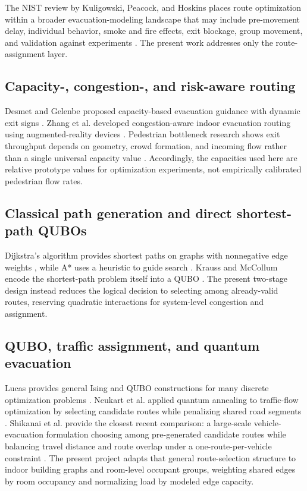 \documentclass[11pt]{article}
\begin{document}
The NIST review by Kuligowski, Peacock, and Hoskins places route optimization within a broader evacuation-modeling landscape that may include pre-movement delay, individual behavior, smoke and fire effects, exit blockage, group movement, and validation against experiments \cite{kuligowski}. The present work addresses only the route-assignment layer.

\subsection{Capacity-, congestion-, and risk-aware routing}
Desmet and Gelenbe proposed capacity-based evacuation guidance with dynamic exit signs \cite{desmet}. Zhang et al. developed congestion-aware indoor evacuation routing using augmented-reality devices \cite{zhang}. Pedestrian bottleneck research shows exit throughput depends on geometry, crowd formation, and incoming flow rather than a single universal capacity value \cite{ye}. Accordingly, the capacities used here are relative prototype values for optimization experiments, not empirically calibrated pedestrian flow rates.

\subsection{Classical path generation and direct shortest-path QUBOs}
Dijkstra's algorithm provides shortest paths on graphs with nonnegative edge weights \cite{dijkstra}, while A* uses a heuristic to guide search \cite{astar}. Krauss and McCollum encode the shortest-path problem itself into a QUBO \cite{krauss}. The present two-stage design instead reduces the logical decision to selecting among already-valid routes, reserving quadratic interactions for system-level congestion and assignment.

\subsection{QUBO, traffic assignment, and quantum evacuation}
Lucas provides general Ising and QUBO constructions for many discrete optimization problems \cite{lucas}. Neukart et al. applied quantum annealing to traffic-flow optimization by selecting candidate routes while penalizing shared road segments \cite{neukart}. Shikanai et al. provide the closest recent comparison: a large-scale vehicle-evacuation formulation choosing among pre-generated candidate routes while balancing travel distance and route overlap under a one-route-per-vehicle constraint \cite{shikanai}. The present project adapts that general route-selection structure to indoor building graphs and room-level occupant groups, weighting shared edges by room occupancy and normalizing load by modeled edge capacity.
\end{document}

